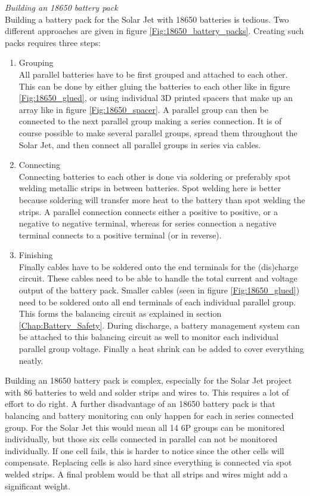 \textit{Building an 18650 battery pack}\\
Building a battery pack for the Solar Jet with 18650 batteries is tedious. Two different approaches are given in figure \ref{Fig:18650_battery_packs}. Creating such packs requires three steps:
\begin{enumerate}
\item Grouping\\
All parallel batteries have to be first grouped and attached to each other. This can be done by either gluing the batteries to each other like in figure \ref{Fig:18650_glued}, or using individual 3D printed spacers that make up an array like in figure \ref{Fig:18650_spacer}. A parallel group can then be connected to the next parallel group making a series connection. It is of course possible to make several parallel groups, spread them throughout the Solar Jet, and then connect all parallel groups in series via cables.
\item Connecting\\
Connecting batteries to each other is done via soldering or preferably spot welding metallic strips in between batteries. Spot welding here is better because soldering will transfer more heat to the battery than spot welding the strips. A parallel connection connects either a positive to positive, or a negative to negative terminal, whereas for series connection a negative terminal connects to a positive terminal (or in reverse).
\item Finishing\\
Finally cables have to be soldered onto the end terminals for the (dis)charge circuit. These cables need to be able to handle the total current and voltage output of the battery pack. Smaller cables (seen in figure \ref{Fig:18650_glued}) need to be soldered onto all end terminals of each individual parallel group. This forms the balancing circuit as explained in section \ref{Chap:Battery_Safety}. During discharge, a battery management system can be attached to this balancing circuit as well to monitor each individual parallel group voltage. Finally a heat shrink can be added to cover everything neatly.
\end{enumerate}
Building an 18650 battery pack is complex, especially for the Solar Jet project with 86 batteries to weld and solder strips and wires to. This requires a lot of effort to do right. A further disadvantage of an 18650 battery pack is that balancing and battery monitoring can only happen for each in series connected group. For the Solar Jet this would mean all 14 6P groups can be monitored individually, but those six cells connected in parallel can not be monitored individually. If one cell fails, this is harder to notice since the other cells will compensate. Replacing cells is also hard since everything is connected via spot welded strips. A final problem would be that all strips and wires might add a significant weight.

